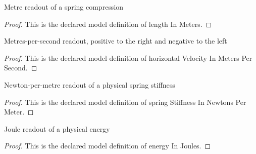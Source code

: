 \begin{definition}
  \label{def:physics:phyx-mini-0763:phyxminiproblems-problemphyxmini0763-lengthinmeters}
  Metre readout of a spring compression
\end{definition}
\begin{proof}
  This is the declared model definition of length In Meters.
\end{proof}
\begin{definition}
  \label{def:physics:phyx-mini-0763:phyxminiproblems-problemphyxmini0763-horizontalvelocityinmeterspersecond}
  Metres-per-second readout, positive to the right and negative to the left
\end{definition}
\begin{proof}
  This is the declared model definition of horizontal Velocity In Meters Per Second.
\end{proof}
\begin{definition}
  \label{def:physics:phyx-mini-0763:phyxminiproblems-problemphyxmini0763-springstiffnessinnewtonspermeter}
  Newton-per-metre readout of a physical spring stiffness
\end{definition}
\begin{proof}
  This is the declared model definition of spring Stiffness In Newtons Per Meter.
\end{proof}
\begin{definition}
  \label{def:physics:phyx-mini-0763:phyxminiproblems-problemphyxmini0763-energyinjoules}
  Joule readout of a physical energy
\end{definition}
\begin{proof}
  This is the declared model definition of energy In Joules.
\end{proof}
